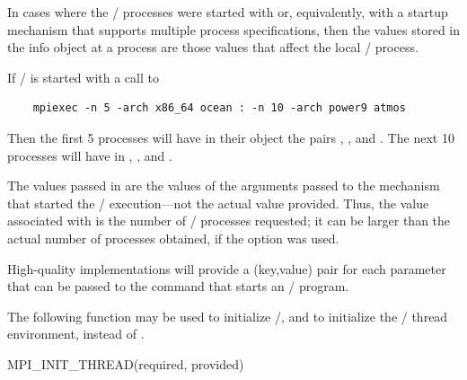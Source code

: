 In cases where the \MPI/ processes were started with
 or, equivalently, with  a
startup mechanism that supports multiple process specifications, then
the values stored in the info object  at a
process are those values that affect the local \MPI/ process.

\begin{example}
%
If \MPI/ is started with a call to
\begin{verbatim}
    mpiexec -n 5 -arch x86_64 ocean : -n 10 -arch power9 atmos
\end{verbatim}
Then the first 5 processes will have in their
 object the pairs ,
,
and . The next 10 processes will have  in
 ,
,
and .
\end{example}

\begin{users}
The values passed in  are the values of the
arguments passed to the mechanism that started the \MPI/ execution---not
the actual value provided. Thus, the value associated with
 is the number of \MPI/ processes requested; it can
be larger than the actual number of processes obtained, if the
 option was used.
\end{users}

\begin{implementors}
High-quality implementations will provide a (key,value) pair for each
parameter that can be passed to the command that starts an \MPI/
program.
\end{implementors}

\label{sec:ei-threads-initialization}

The following function may be used to initialize \MPI/, and to initialize
the \MPI/ thread environment, instead of .

\begin{funcdef}{MPI\_INIT\_THREAD}{(\mbox{required}, \mbox{provided})}
\end{funcdef}

